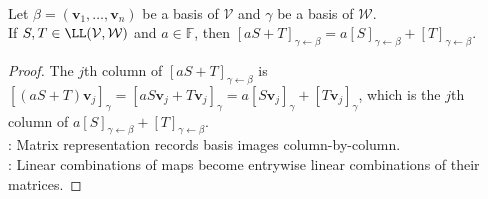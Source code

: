 \begin{proposition} \label{prop:matrix-representation-respects-linear-combinations} \\
Let $\beta=(\mathbf{v}_1,\ldots,\mathbf{v}_n)$ be a basis of $\mathcal{V}$ and $\gamma$ be a basis of $\mathcal{W}$.\\
 If $S,T\in\LL(\mathcal{V},\mathcal{W})$ and $a\in\mathbb{F}$, then $[aS+T]_{\gamma \leftarrow \beta}=a[S]_{\gamma \leftarrow \beta}+[T]_{\gamma \leftarrow \beta}$.
\begin{proof}
The $j$th column of $[aS+T]_{\gamma \leftarrow \beta}$ is $[(aS+T)\mathbf{v}_j]_{\gamma}=[aS\mathbf{v}_j+T\mathbf{v}_j]_{\gamma}=a[S\mathbf{v}_j]_{\gamma}+[T\mathbf{v}_j]_{\gamma}$, which is the $j$th column of $a[S]_{\gamma \leftarrow \beta}+[T]_{\gamma \leftarrow \beta}$.\\
: Matrix representation records basis images column-by-column.\\
: Linear combinations of maps become entrywise linear combinations of their matrices.
\end{proof}
\end{proposition}
